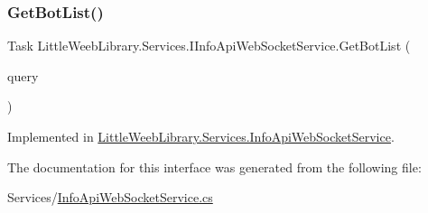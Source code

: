 \subsubsection{\texorpdfstring{Get\+Bot\+List()}{GetBotList()}}
{\footnotesize\ttfamily Task Little\+Weeb\+Library.\+Services.\+I\+Info\+Api\+Web\+Socket\+Service.\+Get\+Bot\+List (\begin{DoxyParamCaption}\item[{J\+Object}]{query }\end{DoxyParamCaption})}



Implemented in \mbox{\hyperlink{class_little_weeb_library_1_1_services_1_1_info_api_web_socket_service_a5f91364bc403db5d521f15881a385143}{Little\+Weeb\+Library.\+Services.\+Info\+Api\+Web\+Socket\+Service}}.



The documentation for this interface was generated from the following file\+:\begin{DoxyCompactItemize}
\item 
Services/\mbox{\hyperlink{_info_api_web_socket_service_8cs}{Info\+Api\+Web\+Socket\+Service.\+cs}}\end{DoxyCompactItemize}
